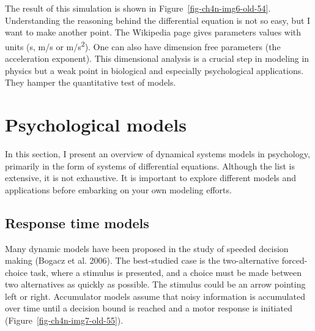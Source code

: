 \documentclass[
  a4paper,
  DIV=11,
  numbers=noendperiod,
  oneside]{scrreprt}
\begin{document}
The result of this simulation is shown in
Figure~\ref{fig-ch4n-img6-old-54}. Understanding the reasoning behind
the differential equation is not so easy, but I want to make another
point. The Wikipedia page gives parameters values with units (s, m/s or
m/s\textsuperscript{2}). One can also have dimension free parameters
(the acceleration exponent). This dimensional analysis is a crucial step
in modeling in physics but a weak point in biological and especially
psychological applications. They hamper the quantitative test of models.

\hypertarget{sec-Psychological-models}{%
\section{Psychological models}\label{sec-Psychological-models}}

In this section, I present an overview of dynamical systems models in
psychology, primarily in the form of systems of differential equations.
Although the list is extensive, it is not exhaustive. It is important to
explore different models and applications before embarking on your own
modeling efforts.

\hypertarget{sec-Response-time-models}{%
\subsection{Response time models}\label{sec-Response-time-models}}

Many dynamic models have been proposed in the study of speeded decision
making (Bogacz et al. 2006). The best-studied case is the
two-alternative forced-choice task, where a stimulus is presented, and a
choice must be made between two alternatives as quickly as possible. The
stimulus could be an arrow pointing left or right. Accumulator models
assume that noisy information is accumulated over time until a decision
bound is reached and a motor response is initiated
(Figure~\ref{fig-ch4n-img7-old-55}).
\end{document}
